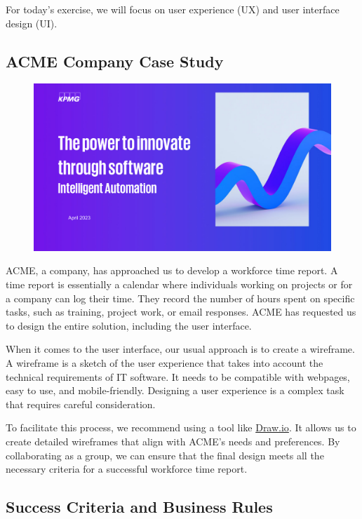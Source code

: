 For today's exercise, we will focus on user experience (UX) and user
interface design (UI).

\subsection{ACME Company Case Study}\label{acme-company-case-study}

\begin{figure}[!h]
    \centering
    \includegraphics[page=17, trim = 2cm 2cm 2cm 0cm, clip, width=\textwidth]{images/02 - KPMG_intelligent_automation_2.pdf}
\end{figure}

ACME, a company, has approached us to develop a workforce time report. A
time report is essentially a calendar where individuals working on
projects or for a company can log their time. They record the number of
hours spent on specific tasks, such as training, project work, or email
responses. ACME has requested us to design the entire solution,
including the user interface.

When it comes to the user interface, our usual approach is to create a
wireframe. A wireframe is a sketch of the user experience that takes
into account the technical requirements of IT software. It needs to be
compatible with webpages, easy to use, and mobile-friendly. Designing a
user experience is a complex task that requires careful consideration.

To facilitate this process, we recommend using a tool like \href{https://www.drawio.com}{Draw.io}. It
allows us to create detailed wireframes that align with ACME's needs and
preferences. By collaborating as a group, we can ensure that the final
design meets all the necessary criteria for a successful workforce time
report.

\subsection{Success Criteria and Business
    Rules}\label{success-criteria-and-business-rules}

